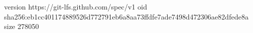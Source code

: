 version https://git-lfs.github.com/spec/v1
oid sha256:eb1cc401174889526d772791eb6a8aa73ffdfe7ade7498d472306ae82dfede8a
size 278050

